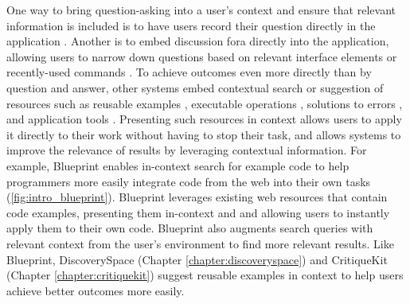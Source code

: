 One way to bring question-asking into a user's context and ensure that relevant information is included is to have users record their question directly in the application \cite{Chen2017}. Another is to embed discussion fora directly into the application, allowing users to narrow down questions based on relevant interface elements \cite{Chilana2012} or recently-used commands \cite{Matejka2011a}. To achieve outcomes even more directly than by question and answer, other systems embed contextual search or suggestion of resources such as reusable examples \cite{Brandt2010}, executable operations \cite{Kandel2011}, solutions to errors \cite{Hartmann2010}, and application tools \cite{Adar2014}. Presenting such resources in context allows users to apply it directly to their work without having to stop their task, and allows systems to improve the relevance of results by leveraging contextual information. 
For example, Blueprint \cite{Brandt2010} enables in-context search for example code to help programmers more easily integrate code from the web into their own tasks (\autoref{fig:intro_blueprint}). Blueprint leverages existing web resources that contain code examples, presenting them in-context and and allowing users to instantly apply them to their own code. Blueprint also augments search queries with relevant context from the user's environment to find more relevant results.
Like Blueprint, DiscoverySpace (Chapter \ref{chapter:discoveryspace}) and CritiqueKit (Chapter \ref{chapter:critiquekit}) suggest reusable examples in context to help users achieve better outcomes more easily.
